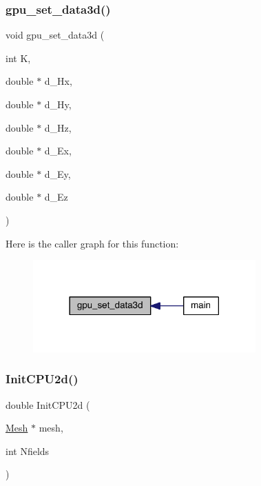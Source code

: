 \mbox{\label{a00554_ad512c37561b25c93d8d7c7717a500df4}} 
\subsubsection{\texorpdfstring{gpu\+\_\+set\+\_\+data3d()}{gpu\_set\_data3d()}}
{\footnotesize\ttfamily void gpu\+\_\+set\+\_\+data3d (\begin{DoxyParamCaption}\item[{int}]{K,  }\item[{double $\ast$}]{d\+\_\+\+Hx,  }\item[{double $\ast$}]{d\+\_\+\+Hy,  }\item[{double $\ast$}]{d\+\_\+\+Hz,  }\item[{double $\ast$}]{d\+\_\+\+Ex,  }\item[{double $\ast$}]{d\+\_\+\+Ey,  }\item[{double $\ast$}]{d\+\_\+\+Ez }\end{DoxyParamCaption})}

Here is the caller graph for this function\+:\nopagebreak
\begin{figure}[H]
\begin{center}
\leavevmode
\includegraphics[width=242pt]{a00554_ad512c37561b25c93d8d7c7717a500df4_icgraph}
\end{center}
\end{figure}
\mbox{\label{a00554_acc775dc40019b5ac599de29b12411161}} 
\subsubsection{\texorpdfstring{Init\+C\+P\+U2d()}{InitCPU2d()}}
{\footnotesize\ttfamily double Init\+C\+P\+U2d (\begin{DoxyParamCaption}\item[{\hyperlink{a00557_aeffbe0891ab73a4d8964c9cb7978426e}{Mesh} $\ast$}]{mesh,  }\item[{int}]{Nfields }\end{DoxyParamCaption})}

